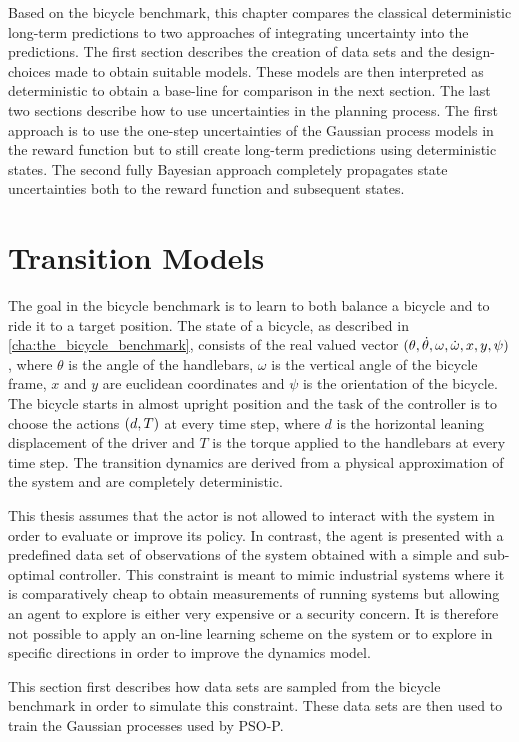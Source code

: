 Based on the bicycle benchmark, this chapter compares the classical deterministic long-term predictions to two approaches of integrating uncertainty into the predictions.
The first section describes the creation of data sets and the design-choices made to obtain suitable models.
These models are then interpreted as deterministic to obtain a base-line for comparison in the next section.
The last two sections describe how to use uncertainties in the planning process.
The first approach is to use the one-step uncertainties of the Gaussian process models in the reward function but to still create long-term predictions using deterministic states.
The second fully Bayesian approach completely propagates state uncertainties both to the reward function and subsequent states.

\section{Transition Models}
The goal in the bicycle benchmark is to learn to both balance a bicycle and to ride it to a target position.
The state of a bicycle, as described in \cref{cha:the_bicycle_benchmark}, consists of the real valued vector $(\theta, \dot{\theta}, \omega, \dot{\omega}, x, y, \psi)$, where $\theta$ is the angle of the handlebars, $\omega$ is the vertical angle of the bicycle frame, $x$ and $y$ are euclidean coordinates and $\psi$ is the orientation of the bicycle.
The bicycle starts in almost upright position and the task of the controller is to choose the actions $(d, T)$ at every time step, where $d$ is the horizontal leaning displacement of the driver and $T$ is the torque applied to the handlebars at every time step.
The transition dynamics are derived from a physical approximation of the system and are completely deterministic.

This thesis assumes that the actor is not allowed to interact with the system in order to evaluate or improve its policy.
In contrast, the agent is presented with a predefined data set of observations of the system obtained with a simple and sub-optimal controller.
This constraint is meant to mimic industrial systems where it is comparatively cheap to obtain measurements of running systems but allowing an agent to explore is either very expensive or a security concern.
It is therefore not possible to apply an on-line learning scheme on the system or to explore in specific directions in order to improve the dynamics model.

This section first describes how data sets are sampled from the bicycle benchmark in order to simulate this constraint.
These data sets are then used to train the Gaussian processes used by PSO-P.

